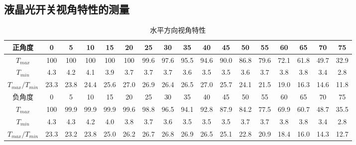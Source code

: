 \documentclass{report}
\begin{document}
	\subsection{液晶光开关视角特性的测量}
	\begin{table}[!h]
		\centering
		\caption{\heiti{}水平方向视角特性}
		\begin{tabular}{|c|c|c|c|c|c|c|c|c|c|c|c|c|c|c|c|c|}
			
			\hline
			正角度&0&5&10&15&20&25&30&35&40&45&50&55&60&65&70&75\\
			\hline
			$ T_{max} $&100&100&100&100&100&99.6&97.6&95.5&94.6&90.0&86.8&79.6&72.1&61.8&49.7&32.9\\
			\hline
			$ T_{min} $&4.3&4.2&4.1&3.9&3.7&3.7&3.7&3.6&3.5&3.5&3.6&3.7&3.8&3.8&3.4&2.8\\
			\hline
			$ T_{max}/T_{min} $&23.3&23.8&24.4&25.6&27.0&26.9&26.4&26.5&27.0&25.7&24.1&21.5&19.0&16.3&14.6&11.8\\
			\hline
			负角度&0&5&10&15&20&25&30&35&40&45&50&55&60&65&70&75\\
			\hline
			$ T_{max} $&100&99.9&99.9&99.9&99.6&98.8&96.5&94.1&92.8&87.9&84.2&77.5&69.9&60.7&48.7&35.5\\
			\hline
			$ T_{min} $&4.3&4.3&4.2&4.0&3.8&3.7&3.6&3.5&3.5&3.5&3.7&3.7&3.8&3.8&3.4&2.8\\
			\hline
			$ T_{max}/T_{min}$&23.3&23.2&23.8&25.0&26.2&26.7&26.8&26.9&26.5&25.1&22.8&20.9&18.4&16.0&14.3&12.7\\
			\hline
			
			
			
		\end{tabular}
	\end{table}
\end{document}
